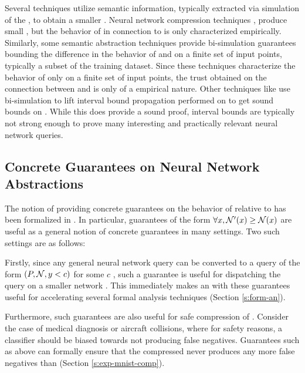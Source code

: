 Several techniques utilize semantic information, typically extracted via
simulation of the \dnn, to obtain a smaller \abs. 
Neural network compression techniques \cite{dnn-compression}, produce small
\abs, but the
behavior of \abs in connection to \cnc is only characterized empirically.
Similarly, some semantic abstraction techniques \cite{lin-comb-abs-jan} provide
bi-simulation guarantees bounding the difference in the behavior of \abs and
\cnc on a finite set of input points, typically a subset of the training
dataset. Since these techniques characterize the behavior of \abs only on a
finite set of
input points, the trust obtained on the connection between \cnc and \abs is only
of a empirical nature.
Other techniques like \cite{deep-abstract} use bi-simulation to lift
interval bound propagation performed on \abs to get sound bounds on \cnc. While
this does provide a sound proof, interval bounds are typically not strong enough
to prove many interesting and practically relevant neural network queries.

\subsection{Concrete Guarantees on Neural Network Abstractions}
\label{s:conc-abs}

The notion of providing concrete guarantees on the behavior of \abs relative to
\cnc has been formalized in \cite{cegar-nn}. In particular, guarantees of the
form $\forall x, \mathcal{N'}(x) \geq \mathcal{N}(x)$ are useful as a general notion of concrete
guarantees in many settings. Two such settings are as follows: 

Firstly, since any general neural network query can be converted to a query of
the form $(P, \mathcal{N}, y < c)$ for some $c$ \cite{cegar-nn, reluplex,
lipschitz-reach}, such a guarantee is
useful for dispatching the query on a smaller network \cite{cegar-nn, cegarette,
cleverest-nn}. This immediately makes an \abs with these guarantees useful for
accelerating several formal analysis techniques (Section \ref{s:form-an}).

Furthermore, such guarantees are also useful for safe compression of \dnn.
Consider the case of medical diagnosis \cite{b1} or aircraft
collisions\cite{acasxu}, where
for safety reasons, a classifier should be biased towards not producing false
negatives. Guarantees such as above can formally ensure that the compressed \abs
never produces any more false negatives than \cnc (Section
\ref{s:exp-mnist-comp}).


